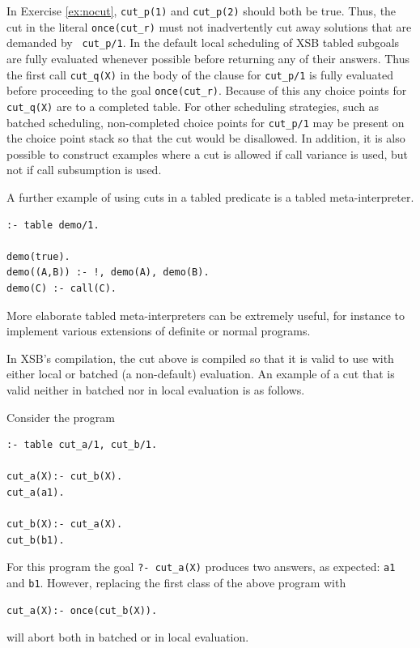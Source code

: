 In Exercise \ref{ex:nocut}, {\tt cut\_p(1)} and {\tt cut\_p(2)} should
both be true.  Thus, the cut in the literal {\tt once(cut\_r)} must
not inadvertently cut away solutions that are demanded by {\tt
  cut\_p/1}.  In the default local scheduling of XSB \version{} tabled
subgoals are fully evaluated whenever possible before returning any of
their answers.  Thus the first call {\tt cut\_q(X)} in the body of the
clause for {\tt cut\_p/1} is fully evaluated before proceeding to the
goal {\tt once(cut\_r)}.  Because of this any choice points for {\tt
  cut\_q(X)} are to a completed table.  For other scheduling
strategies, such as batched scheduling, non-completed choice points
for {\tt cut\_p/1} may be present on the choice point stack so that the
cut would be disallowed.  In addition, it is also possible to
construct examples where a cut is allowed if call variance is used,
but not if call subsumption is used.

\begin{example}
A further example of using cuts in a tabled predicate is a tabled
meta-interpreter.
\begin{verbatim}
:- table demo/1.

demo(true).
demo((A,B)) :- !, demo(A), demo(B).
demo(C) :- call(C).
\end{verbatim}
More elaborate tabled meta-interpreters can be extremely useful, for
instance to implement various extensions of definite or normal
programs.\fillBox
\end{example}

In XSB's compilation, the cut above is compiled so that it is valid to
use with either local or batched (a non-default) evaluation.  An
example of a cut that is valid neither in batched nor in local
evaluation is as follows.

\begin{example} \label{ex:cutTable}
Consider the program
\begin{verbatim}
:- table cut_a/1, cut_b/1.

cut_a(X):- cut_b(X).
cut_a(a1).

cut_b(X):- cut_a(X).
cut_b(b1).
\end{verbatim}
For this program the goal {\tt ?- cut\_a(X)} produces two answers, as
expected: {\tt a1} and {\tt b1}.  However, replacing the first class
of the above program with 
\begin{verbatim}
cut_a(X):- once(cut_b(X)).
\end{verbatim}
will abort both in batched or in local evaluation.
\fillBox
\end{example}

